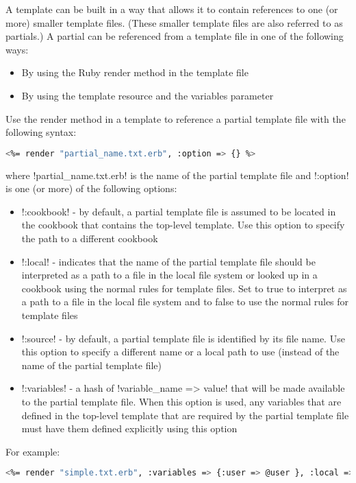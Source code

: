 A template can be built in a way that allows it to contain references to one (or more) smaller template files. (These smaller template files are also referred to as partials.) A partial can be referenced from a template file in one of the following ways:

\begin{itemize}
  \item By using the Ruby render method in the template file
  \item By using the template resource and the variables parameter
\end{itemize}

Use the render method in a template to reference a partial template file with the following syntax:

\begin{lstlisting}[language=Bash,label=lst:cookbook-templates10]
<%= render "partial_name.txt.erb", :option => {} %>
\end{lstlisting}

where \inline!partial_name.txt.erb! is the name of the partial template file and \inline!:option! is one (or more) of the following options:

\begin{itemize}
  \item \inline!:cookbook! - by default, a partial template file is assumed to be located in the cookbook that contains the top-level template. Use this option to specify the path to a different cookbook
  \item \inline!:local! - indicates that the name of the partial template file should be interpreted as a path to a file in the local file system or looked up in a cookbook using the normal rules for template files. Set to true to interpret as a path to a file in the local file system and to false to use the normal rules for template files
  \item \inline!:source! - by default, a partial template file is identified by its file name. Use this option to specify a different name or a local path to use (instead of the name of the partial template file)
  \item \inline!:variables! - a hash of \inline!variable_name => value! that will be made available to the partial template file. When this option is used, any variables that are defined in the top-level template that are required by the partial template file must have them defined explicitly using this option
\end{itemize}

For example:

\begin{lstlisting}[language=Bash,label=lst:cookbook-templates11]
<%= render "simple.txt.erb", :variables => {:user => @user }, :local => true %>
\end{lstlisting}

